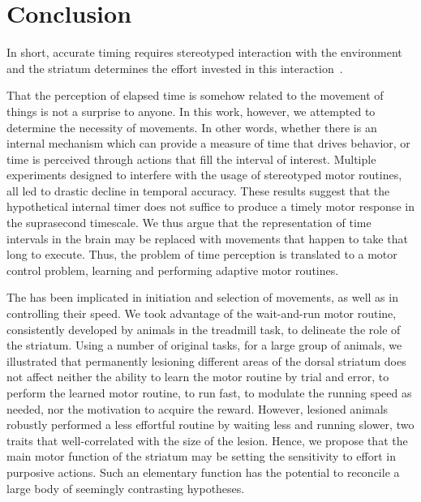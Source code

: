\section{Conclusion} \label{ch:discussion:conclusion}

In short, accurate timing requires stereotyped interaction with the environment and the striatum determines the effort invested in this interaction~\cite{Safaie2020PNAS,JuradoParras2020}.
\par
That the perception of elapsed time is somehow related to the movement of things is not a surprise to anyone.
In this work, however, we attempted to determine the necessity of movements.
In other words, whether there is an internal mechanism which can provide a measure of time that drives behavior, or time is perceived through actions that fill the interval of interest.
Multiple experiments designed to interfere with the usage of stereotyped motor routines, all led to drastic decline in temporal accuracy.
These results suggest that the hypothetical internal timer does not suffice to produce a timely motor response in the suprasecond timescale.
We thus argue that the representation of time intervals in the brain may be replaced with movements that happen to take that long to execute.
Thus, the problem of time perception is translated to a motor control problem, learning and performing adaptive motor routines.
\par
The  has been implicated in initiation and selection of movements, as well as in controlling their speed.
We took advantage of the wait-and-run motor routine, consistently developed by animals in the treadmill task, to delineate the role of the striatum.
Using a number of original tasks, for a large group of animals, we illustrated that permanently lesioning different areas of the dorsal striatum does not affect neither the ability to learn the motor routine by trial and error, to perform the learned motor routine, to run fast, to modulate the running speed as needed, nor the motivation to acquire the reward.
However, lesioned animals robustly performed a less effortful routine by waiting less and running slower, two traits that well-correlated with the size of the lesion.
Hence, we propose that the main motor function of the striatum may be setting the sensitivity to effort in purposive actions.
Such an elementary function has the potential to reconcile a large body of seemingly contrasting hypotheses.